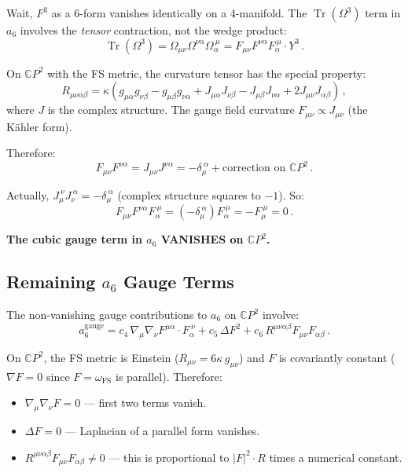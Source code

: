 \documentclass[11pt,a4paper]{article}
\newcommand{\Tr}{\operatorname{Tr}}
\newcommand{\CP}{\mathbb{C}P}
\begin{document}
Wait, $F^3$ as a 6-form vanishes identically on a 4-manifold. The $\Tr(\Omega^3)$ term in $a_6$ involves the \emph{tensor} contraction, not the wedge product:
\begin{equation}
\Tr(\Omega^3) = \Omega_{\mu\nu}\Omega^{\nu\alpha}\Omega_{\alpha}^{\ \mu} = F_{\mu\nu}F^{\nu\alpha}F_{\alpha}^{\ \mu} \cdot Y^3\,.
\end{equation}

On $\CP^2$ with the FS metric, the curvature tensor has the special property:
\begin{equation}
R_{\mu\nu\alpha\beta} = \kappa\left(g_{\mu\alpha}g_{\nu\beta} - g_{\mu\beta}g_{\nu\alpha} + J_{\mu\alpha}J_{\nu\beta} - J_{\mu\beta}J_{\nu\alpha} + 2J_{\mu\nu}J_{\alpha\beta}\right)\,,
\end{equation}
where $J$ is the complex structure. The gauge field curvature $F_{\mu\nu} \propto J_{\mu\nu}$ (the K\"ahler form).

Therefore:
\begin{equation}
F_{\mu\nu}F^{\nu\alpha} = J_{\mu\nu}J^{\nu\alpha} = -\delta_\mu^{\ \alpha} + \text{correction on } \CP^2\,.
\end{equation}

Actually, $J_\mu^{\ \nu}J_\nu^{\ \alpha} = -\delta_\mu^{\ \alpha}$ (complex structure squares to $-1$). So:
\begin{equation}
F_{\mu\nu}F^{\nu\alpha}F_{\alpha}^{\ \mu} = (-\delta_\mu^{\ \alpha})F_{\alpha}^{\ \mu} = -F_{\mu}^{\ \mu} = 0\,.
\end{equation}

\textbf{The cubic gauge term in $a_6$ VANISHES on $\CP^2$.}

\subsection{Remaining $a_6$ Gauge Terms}

The non-vanishing gauge contributions to $a_6$ on $\CP^2$ involve:
\begin{equation}
a_6^{\mathrm{gauge}} = c_4\,\nabla_\mu\nabla_\nu F^{\mu\alpha} \cdot F_\alpha^{\ \nu} + c_5\,\Delta F^2 + c_6\,R^{\mu\nu\alpha\beta}F_{\mu\nu}F_{\alpha\beta}\,.
\end{equation}

On $\CP^2$, the FS metric is Einstein ($R_{\mu\nu} = 6\kappa\,g_{\mu\nu}$) and $F$ is covariantly constant ($\nabla F = 0$ since $F = \omega_{\mathrm{FS}}$ is parallel). Therefore:
\begin{itemize}
\item $\nabla_\mu\nabla_\nu F = 0$ --- first two terms vanish.
\item $\Delta F = 0$ --- Laplacian of a parallel form vanishes.
\item $R^{\mu\nu\alpha\beta}F_{\mu\nu}F_{\alpha\beta} \neq 0$ --- this is proportional to $|F|^2 \cdot R$ times a numerical constant.
\end{itemize}
\end{document}
